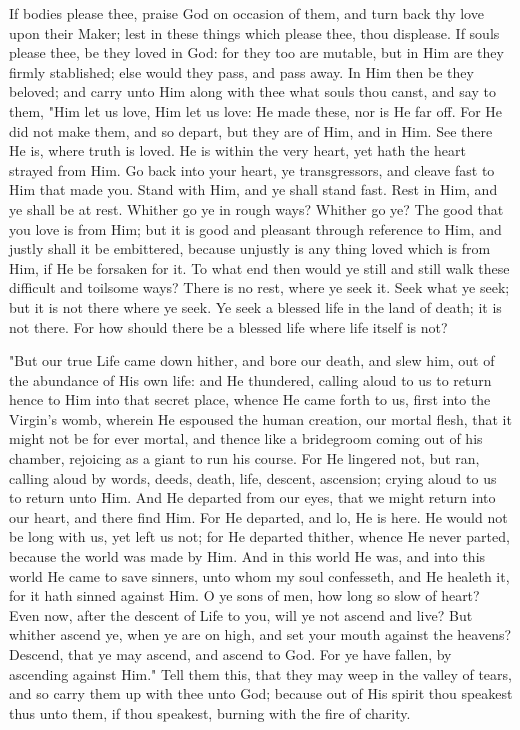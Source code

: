 \documentclass[b5paper,openright,12pt,twoside]{book}
\begin{document}
If bodies please thee, praise God on occasion of them, and turn back
thy love upon their Maker; lest in these things which please thee, thou
displease. If souls please thee, be they loved in God: for they too are
mutable, but in Him are they firmly stablished; else would they pass,
and pass away. In Him then be they beloved; and carry unto Him along
with thee what souls thou canst, and say to them, "Him let us love, Him
let us love: He made these, nor is He far off. For He did not make them,
and so depart, but they are of Him, and in Him. See there He is, where
truth is loved. He is within the very heart, yet hath the heart strayed
from Him. Go back into your heart, ye transgressors, and cleave fast to
Him that made you. Stand with Him, and ye shall stand fast. Rest in Him,
and ye shall be at rest. Whither go ye in rough ways? Whither go ye?
The good that you love is from Him; but it is good and pleasant through
reference to Him, and justly shall it be embittered, because unjustly is
any thing loved which is from Him, if He be forsaken for it. To what end
then would ye still and still walk these difficult and toilsome ways?
There is no rest, where ye seek it. Seek what ye seek; but it is not
there where ye seek. Ye seek a blessed life in the land of death; it is
not there. For how should there be a blessed life where life itself is
not?

"But our true Life came down hither, and bore our death, and slew him,
out of the abundance of His own life: and He thundered, calling aloud to
us to return hence to Him into that secret place, whence He came forth
to us, first into the Virgin's womb, wherein He espoused the human
creation, our mortal flesh, that it might not be for ever mortal, and
thence like a bridegroom coming out of his chamber, rejoicing as a giant
to run his course. For He lingered not, but ran, calling aloud by words,
deeds, death, life, descent, ascension; crying aloud to us to return
unto Him. And He departed from our eyes, that we might return into our
heart, and there find Him. For He departed, and lo, He is here. He would
not be long with us, yet left us not; for He departed thither, whence
He never parted, because the world was made by Him. And in this world
He was, and into this world He came to save sinners, unto whom my soul
confesseth, and He healeth it, for it hath sinned against Him. O ye sons
of men, how long so slow of heart? Even now, after the descent of Life
to you, will ye not ascend and live? But whither ascend ye, when ye are
on high, and set your mouth against the heavens? Descend, that ye may
ascend, and ascend to God. For ye have fallen, by ascending against
Him." Tell them this, that they may weep in the valley of tears, and
so carry them up with thee unto God; because out of His spirit thou
speakest thus unto them, if thou speakest, burning with the fire of
charity.
\end{document}
